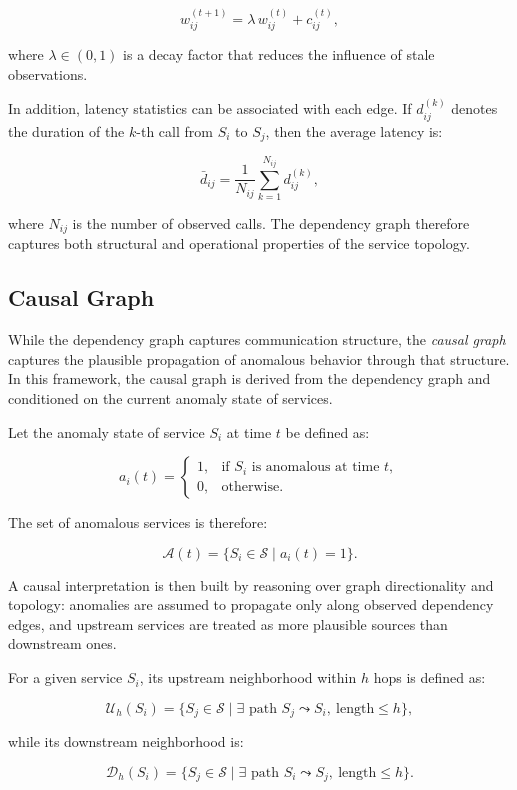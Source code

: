 \[
w_{ij}^{(t+1)} = \lambda \, w_{ij}^{(t)} + c_{ij}^{(t)},
\]

where $\lambda \in (0,1)$ is a decay factor that reduces the influence of stale 
observations.

In addition, latency statistics can be associated with each edge. If 
$d_{ij}^{(k)}$ denotes the duration of the $k$-th call from $S_i$ to $S_j$, then 
the average latency is:

\[
\bar{d}_{ij} = \frac{1}{N_{ij}} \sum_{k=1}^{N_{ij}} d_{ij}^{(k)},
\]

where $N_{ij}$ is the number of observed calls. The dependency graph therefore 
captures both structural and operational properties of the service topology.

\subsection{Causal Graph}
\label{subsec:rca_causal_graph}

While the dependency graph captures communication structure, the \emph{causal 
graph} captures the plausible propagation of anomalous behavior through that 
structure. In this framework, the causal graph is derived from the dependency 
graph and conditioned on the current anomaly state of services.

Let the anomaly state of service $S_i$ at time $t$ be defined as:

\[
a_i(t) =
\begin{cases}
1, & \text{if } S_i \text{ is anomalous at time } t, \\
0, & \text{otherwise.}
\end{cases}
\]

The set of anomalous services is therefore:

\[
\mathcal{A}(t) = \{S_i \in \mathcal{S} \mid a_i(t)=1\}.
\]

A causal interpretation is then built by reasoning over graph directionality and 
topology: anomalies are assumed to propagate only along observed dependency 
edges, and upstream services are treated as more plausible sources than 
downstream ones.

For a given service $S_i$, its upstream neighborhood within $h$ hops is defined 
as:

\[
\mathcal{U}_h(S_i) = \{S_j \in \mathcal{S} \mid \exists \text{ path } S_j \leadsto S_i,\ \text{length} \le h\},
\]

while its downstream neighborhood is:

\[
\mathcal{D}_h(S_i) = \{S_j \in \mathcal{S} \mid \exists \text{ path } S_i \leadsto S_j,\ \text{length} \le h\}.
\]

